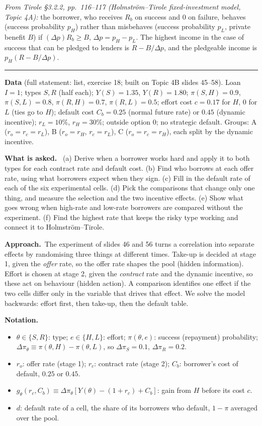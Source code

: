\documentclass[11pt,a4paper]{article}
\newcommand{\notation}{\par\noindent\textbf{Notation.}}
\newcommand{\asked}{\par\medskip\noindent\textbf{What is asked.}~}
\newcommand{\approach}{\par\smallskip\noindent\textbf{Approach.}~}
\newcommand{\stmtend}{\par\endgroup\nopagebreak\noindent\rule{\linewidth}{0.4pt}\par\medskip}
\begin{document}
\emph{From Tirole §3.2.2, pp.~116--117 (Holmström--Tirole fixed-investment model, Topic 4A):} the
borrower, who receives \(R_b\) on success and \(0\) on failure, behaves (success probability
\(p_H\)) rather than misbehaves (success probability \(p_L\), private benefit \(B\)) if
\((\Delta p) R_b \ge B\), \(\Delta p = p_H - p_L\). The highest income in the case of success that
can be pledged to lenders is \(R - B/\Delta p\), and the pledgeable income is
\(p_H(R - B/\Delta p)\).
\stmtend

\noindent\textbf{Data} (full statement: list, exercise 18; built on Topic 4B slides 45--58). Loan $I=1$; types
$S,R$ (half each); $Y(S)=1.35$, $Y(R)=1.80$; $\pi(S,H)=0.9$, $\pi(S,L)=0.8$, $\pi(R,H)=0.7$, $\pi(R,L)=0.5$;
effort cost $c=0.17$ for $H$, $0$ for $L$ (ties go to $H$); default cost $C_b=0.25$ (normal future rate) or
$0.45$ (dynamic incentive); $r_L=10\%$, $r_H=30\%$; outside option $0$; no strategic default.
Groups: A ($r_o=r_c=r_L$), B ($r_o=r_H$, $r_c=r_L$), C ($r_o=r_c=r_H$), each split by the dynamic incentive.

\asked
(a) Derive when a borrower works hard and apply it to both types for each contract rate and default cost.
(b) Find who borrows at each offer rate, using what borrowers expect when they sign.
(c) Fill in the default rate of each of the six experimental cells.
(d) Pick the comparisons that change only one thing, and measure the selection and the two incentive effects.
(e) Show what goes wrong when high-rate and low-rate borrowers are compared without the experiment.
(f) Find the highest rate that keeps the risky type working and connect it to Holmström--Tirole.

\approach The experiment of slides 46 and 56 turns a correlation into separate effects by randomising three
things at different times. Take-up is decided at stage 1, given the \emph{offer} rate, so the offer rate
shapes the pool (hidden information). Effort is chosen at stage 2, given the \emph{contract} rate and the
dynamic incentive, so these act on behaviour (hidden action). A comparison identifies one effect if the two
cells differ only in the variable that drives that effect. We solve the model backwards: effort first, then
take-up, then the default table.

\notation
\begin{itemize}
  \item $\theta\in\{S,R\}$: type; $e\in\{H,L\}$: effort; $\pi(\theta,e)$: success (repayment) probability;
        $\Delta\pi_\theta\equiv\pi(\theta,H)-\pi(\theta,L)$, so $\Delta\pi_S=0.1$, $\Delta\pi_R=0.2$.
  \item $r_o$: offer rate (stage 1); $r_c$: contract rate (stage 2); $C_b$: borrower's cost of default, $0.25$ or $0.45$.
  \item $g_\theta(r_c,C_b)\equiv\Delta\pi_\theta[Y(\theta)-(1+r_c)+C_b]$: gain from $H$ before its cost $c$.
  \item $d$: default rate of a cell, the share of its borrowers who default, $1-\pi$ averaged over the pool.
\end{itemize}
\end{document}
